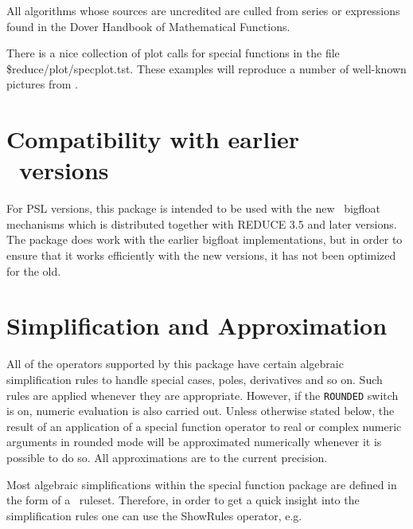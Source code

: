 \documentclass[11pt]{article}
\begin{document}
All algorithms whose sources are uncredited are culled from series or
expressions found in the Dover Handbook of Mathematical
Functions\cite{Abramowitz:72}.

There is a nice collection of plot calls for special functions
in the file \$reduce/plot/specplot.tst. 
These examples will reproduce a number of well-known pictures from
\cite{Abramowitz:72}.

\section{Compatibility with earlier \REDUCE\ versions}

For {PSL} versions,
this package is intended to be used with the new \REDUCE\ bigfloat
mechanisms which is distributed together with REDUCE 3.5 and later versions.
The package does work with the earlier bigfloat implementations,
but in order to 
ensure that it works efficiently with the new versions, it has not been
optimized for the old.

\section{Simplification and Approximation}

All of the operators supported by this package have certain algebraic
simplification rules to handle special cases, poles, derivatives and so
on.  Such rules are applied whenever they are appropriate.  However, if
the {\tt ROUNDED} switch is on, numeric evaluation is also carried out.
Unless otherwise stated below, the result of an application of a special
function operator to real or complex numeric arguments in rounded mode
will be approximated numerically whenever it is possible to do so.  All
approximations are to the current precision.

Most algebraic simplifications within the special function package 
are defined in the form of a \REDUCE\ ruleset. Therefore, in order to
get a quick insight into the simplification rules one can use the
ShowRules operator, e.g.\\
\end{document}
